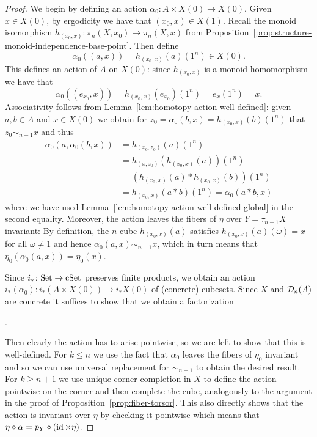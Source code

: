 \begin{proof}
We begin by defining an action $\alpha_0\colon A\times X(0)\to X(0)$.
Given $x\in X(0)$, by ergodicity we have that $(x_0,x)\in X(1)$.
Recall the monoid isomorphism $h_{(x_0,x)}\colon\pi_n(X,x_0)\to\pi_n(X,x)$ from Proposition~\ref{prop:structure-monoid-independence-base-point}.
Then define
\[
    \alpha_0((a,x)) = h_{(x_0,x)}(a)(1^n)\in X(0).
\]
This defines an action of $A$ on $X(0)$:
since $h_{(x_0,x)}$ is a monoid homomorphism we have that
\[
    \alpha_0((e_{x_0},x)) = h_{(x_0,x)}(e_{x_0})(1^n) = e_x(1^n) = x.
\]
Associativity follows from Lemma~\ref{lem:homotopy-action-well-defined}:
given $a,b\in A$ and $x\in X(0)$ we obtain for $z_0 = \alpha_0(b,x) = h_{(x_0,x)}(b)(1^n)$ that
$z_0\sim_{n-1} x$ and thus
\begin{align*}
       \alpha_0(a,\alpha_0(b,x))
    &= h_{(x_0,z_0)}(a)(1^n) \\
    &= h_{(x,z_0)}(h_{(x_0,x)}(a))(1^n) \\
    &= (h_{(x_0,x)}(a)*h_{(x_0,x)}(b))(1^n) \\
    &= h_{(x_0,x)}(a*b)(1^n)
    = \alpha_0(a*b,x)
\end{align*}
where we have used Lemma~\ref{lem:homotopy-action-well-defined-global} in the second equality.
Moreover, the action leaves the fibers of $\eta$ over $Y = \tau_{n-1}X$ invariant:
By definition, the $n$-cube $h_{(x_0,x)}(a)$ satisfies $h_{(x_0,x)}(a)(\omega) = x$ for all $\omega\neq 1$
and hence $\alpha_0(a,x)\sim_{n-1} x$, which in turn means that $\eta_0(\alpha_0(a,x)) = \eta_0(x)$.

Since $i_\ast\colon\mathrm{Set}\to\mathrm{cSet}$ preserves finite products,
we obtain an action $i_\ast(\alpha_0)\colon i_\ast(A\times X(0))\to i_\ast X(0)$ of (concrete) cubesets.
Since $X$ and $\mathcal{D}_n(A)$ are concrete it suffices to show that we obtain a factorization
\begin{center}
.
\end{center}
Then clearly the action has to arise pointwise,
so we are left to show that this is well-defined.
For $k\leq n$ we use the fact that $\alpha_0$ leaves the fibers of $\eta_0$ invariant
and so we can use universal replacement for $\sim_{n-1}$ to obtain the desired result.
For $k\geq n+1$ we use unique corner completion in $X$ to define the action
pointwise on the corner and then complete the cube,
analogously to the argument in the proof of Proposition~\ref{prop:fiber-torsor}.
This also directly shows that the action is invariant over $\eta$ by checking it pointwise
which means that $\eta\circ\alpha = p_Y\circ(\operatorname{id}\times\eta)$.


\end{proof}
